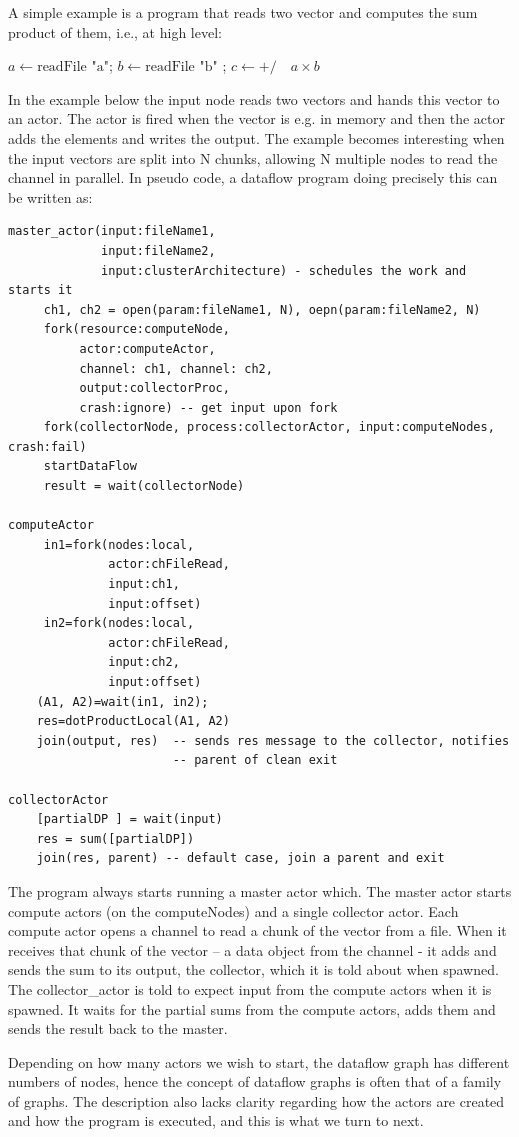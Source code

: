 \documentclass[11pt,a4paper]{article}
\begin{document}
\begin{Example}

  A simple example is a program that reads two vector and computes the
  sum product of them, i.e., at high level:
\begin{algorithmic}
  \State $a\gets \textrm{readFile "a"}$;  $b\gets \textrm{readFile "b"}$ ; $c\gets  \textrm{+/} \quad a\times b$
\end{algorithmic}  
In the example below the input node reads two vectors and hands this
vector to an actor.  The actor is fired when the vector is e.g. in
memory and then the actor adds the elements and writes the output. The
example becomes interesting when the input vectors are split into N
chunks, allowing N multiple nodes to read the channel in parallel.  In
pseudo code, a dataflow program doing precisely this can be written
as:
\begin{lstlisting}
master_actor(input:fileName1, 
             input:fileName2, 
             input:clusterArchitecture) - schedules the work and starts it
     ch1, ch2 = open(param:fileName1, N), oepn(param:fileName2, N)
     fork(resource:computeNode, 
          actor:computeActor, 
          channel: ch1, channel: ch2,
          output:collectorProc,
          crash:ignore) -- get input upon fork
     fork(collectorNode, process:collectorActor, input:computeNodes, crash:fail)
     startDataFlow
     result = wait(collectorNode)

computeActor
     in1=fork(nodes:local, 
              actor:chFileRead, 
              input:ch1,
              input:offset)
     in2=fork(nodes:local, 
              actor:chFileRead, 
              input:ch2,
              input:offset)
    (A1, A2)=wait(in1, in2);
    res=dotProductLocal(A1, A2)
    join(output, res)  -- sends res message to the collector, notifies
                       -- parent of clean exit

collectorActor
    [partialDP ] = wait(input)
    res = sum([partialDP])
    join(res, parent) -- default case, join a parent and exit

\end{lstlisting}

The program always starts running a master actor which. The master
actor starts compute actors (on the computeNodes) and a single
collector actor. Each compute actor opens a channel to read a chunk of
the vector from a file. When it receives that chunk of the vector – a
data object from the channel - it adds and sends the sum to its
output, the collector, which it is told about when spawned.  The
collector\_actor is told to expect input from the compute actors when
it is spawned. It waits for the partial sums from the compute actors,
adds them and sends the result back to the master.

Depending on how many actors we wish to start, the dataflow graph has
different numbers of nodes, hence the concept of dataflow graphs is
often that of a family of graphs.  The description also lacks clarity
regarding how the actors are created and how the program is executed,
and this is what we turn to next.

\end{Example}
\end{document}
